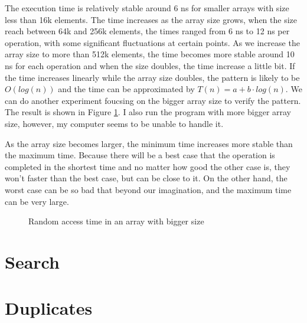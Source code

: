 \documentclass[a4paper,11pt]{article}
\begin{document}
The execution time is relatively stable around 6 ns for smaller arrays with size less 
than 16k elements. The time increases as the array size grows, when the size reach between
64k and 256k elements, the times ranged from 6 ns to 12 ns per operation, with some
significant fluctuations at certain points. As we increase the array size to more than 512k elements,
the time becomes more stable around 10 ns for each operation and when the size doubles, the time
increase a little bit. If the time increases linearly while the array size doubles, the pattern is likely
to be $O(log(n))$ and the time can be approximated by $T(n) = a + b \cdot log(n)$. We can do another
experiment foucsing on the bigger array size to verify the pattern. The result is shown in Figure \ref{fig:random_access_big}.
I also run the program with more bigger array size, however, my computer seems to be unable to handle it.

As the array size becomes larger, the minimum time increases more stable than the maximum time.
Because there will be a best case that the operation is completed in the shortest time and no 
matter how good the other case is, they won't faster than the best case, but can be close to it.
On the other hand, the worst case can be so bad that beyond our imagination, and the maximum time
can be very large.

\begin{figure}[h]
  \centering
  \caption{Random access time in an array with bigger size}
  \label{fig:random_access_big}
\end{figure}

\section*{Search}

\section*{Duplicates}
\end{document}

